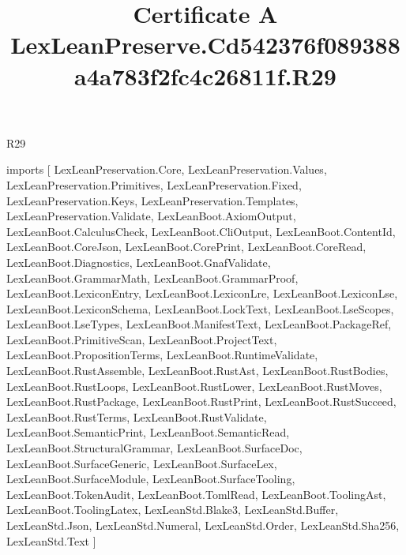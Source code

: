 \begin{lexlean}{R29}
\title{Certificate A LexLeanPreserve.Cd542376f089388a4a783f2fc4c26811f.R29}
\begin{coremodule}
imports [
  LexLeanPreservation.Core,
  LexLeanPreservation.Values,
  LexLeanPreservation.Primitives,
  LexLeanPreservation.Fixed,
  LexLeanPreservation.Keys,
  LexLeanPreservation.Templates,
  LexLeanPreservation.Validate,
  LexLeanBoot.AxiomOutput,
  LexLeanBoot.CalculusCheck,
  LexLeanBoot.CliOutput,
  LexLeanBoot.ContentId,
  LexLeanBoot.CoreJson,
  LexLeanBoot.CorePrint,
  LexLeanBoot.CoreRead,
  LexLeanBoot.Diagnostics,
  LexLeanBoot.GnafValidate,
  LexLeanBoot.GrammarMath,
  LexLeanBoot.GrammarProof,
  LexLeanBoot.LexiconEntry,
  LexLeanBoot.LexiconLre,
  LexLeanBoot.LexiconLse,
  LexLeanBoot.LexiconSchema,
  LexLeanBoot.LockText,
  LexLeanBoot.LseScopes,
  LexLeanBoot.LseTypes,
  LexLeanBoot.ManifestText,
  LexLeanBoot.PackageRef,
  LexLeanBoot.PrimitiveScan,
  LexLeanBoot.ProjectText,
  LexLeanBoot.PropositionTerms,
  LexLeanBoot.RuntimeValidate,
  LexLeanBoot.RustAssemble,
  LexLeanBoot.RustAst,
  LexLeanBoot.RustBodies,
  LexLeanBoot.RustLoops,
  LexLeanBoot.RustLower,
  LexLeanBoot.RustMoves,
  LexLeanBoot.RustPackage,
  LexLeanBoot.RustPrint,
  LexLeanBoot.RustSucceed,
  LexLeanBoot.RustTerms,
  LexLeanBoot.RustValidate,
  LexLeanBoot.SemanticPrint,
  LexLeanBoot.SemanticRead,
  LexLeanBoot.StructuralGrammar,
  LexLeanBoot.SurfaceDoc,
  LexLeanBoot.SurfaceGeneric,
  LexLeanBoot.SurfaceLex,
  LexLeanBoot.SurfaceModule,
  LexLeanBoot.SurfaceTooling,
  LexLeanBoot.TokenAudit,
  LexLeanBoot.TomlRead,
  LexLeanBoot.ToolingAst,
  LexLeanBoot.ToolingLatex,
  LexLeanStd.Blake3,
  LexLeanStd.Buffer,
  LexLeanStd.Json,
  LexLeanStd.Numeral,
  LexLeanStd.Order,
  LexLeanStd.Sha256,
  LexLeanStd.Text
]


\end{coremodule}
\end{lexlean}
